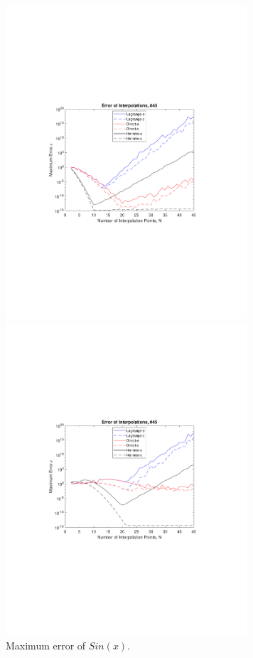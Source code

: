 \documentclass[11pt]{article}%
\begin{document}
\begin{figure}[h]
\centering
\vspace{-115pt} %
\includegraphics[width=9cm]{maxError1_45}%
\vspace{-110pt} %
\caption{Maximum error of $Sin(x)$.}
\vspace{-80pt} %
\includegraphics[width=9cm]{maxError2_45}%

\end{figure}
\end{document}

